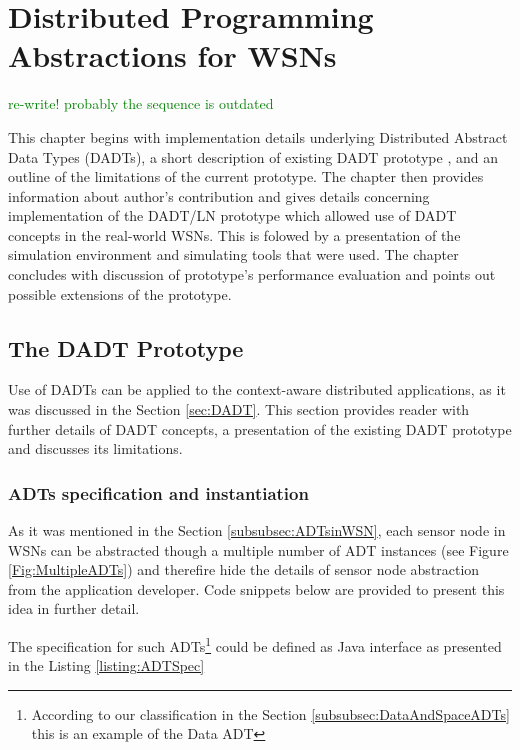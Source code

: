 \chapter{Distributed Programming Abstractions for WSNs}
\label{chap:Implementation}


\textcolor{green}{re-write! probably the sequence is outdated}

This chapter begins with implementation details underlying Distributed Abstract
Data Types (DADTs), a short description of existing DADT prototype
\cite{migliavacca_DADT:2006}, and an outline of the limitations of the current
prototype. The chapter then provides information about author's contribution
and gives details concerning implementation of the DADT/LN prototype which
allowed use of DADT concepts in the real-world WSNs. This is folowed by a presentation of the simulation environment and simulating tools
that were used. The chapter concludes with discussion of prototype's performance
evaluation and points out possible extensions of the prototype.

\section {The DADT Prototype}

Use of DADTs can be applied to the context-aware distributed applications, as
it was discussed in the Section \ref{sec:DADT}. This section provides reader with
further details of DADT concepts, a presentation of the existing DADT
prototype \cite{migliavacca_DADT:2006} and discusses its limitations.

\subsection{ADTs specification and instantiation} \label{subsec:ADTSpecInst}

As it was mentioned in the Section \ref{subsubsec:ADTsinWSN}, each sensor node
in WSNs can be abstracted though a multiple number of ADT instances (see
Figure \ref{Fig:MultipleADTs}) and therefire hide the details of sensor node
abstraction from the application developer. Code snippets below are provided to present this idea in further detail.

The specification for such ADTs\footnote{According to
our classification in the Section \ref{subsubsec:DataAndSpaceADTs} this is an
example of the Data ADT} could be defined as Java interface as presented
in the Listing \ref{listing:ADTSpec}


